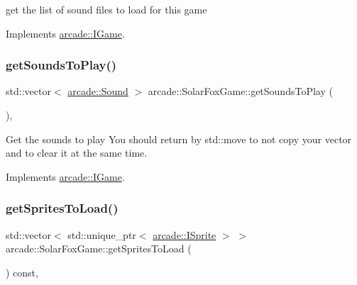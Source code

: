 get the list of sound files to load for this game 



Implements \hyperlink{classarcade_1_1_i_game_a0b66cd9ef3b5cd0dff95debb7e4f594e}{arcade\+::\+I\+Game}.

\mbox{\label{classarcade_1_1_solar_fox_game_a96f41df94a733d0c06f8a7d48e620d58}} 
\subsubsection{\texorpdfstring{get\+Sounds\+To\+Play()}{getSoundsToPlay()}}
{\footnotesize\ttfamily std\+::vector$<$ \hyperlink{structarcade_1_1_sound}{arcade\+::\+Sound} $>$ arcade\+::\+Solar\+Fox\+Game\+::get\+Sounds\+To\+Play (\begin{DoxyParamCaption}{ }\end{DoxyParamCaption})\hspace{0.3cm}{\ttfamily [override]}, {\ttfamily [virtual]}}



Get the sounds to play You should return by std\+::move to not copy your vector and to clear it at the same time. 



Implements \hyperlink{classarcade_1_1_i_game_a88b3c7efb13780cdbbdf5b879a18ed4d}{arcade\+::\+I\+Game}.

\mbox{\label{classarcade_1_1_solar_fox_game_afa9d714001212c869f616bd265dd9371}} 
\subsubsection{\texorpdfstring{get\+Sprites\+To\+Load()}{getSpritesToLoad()}}
{\footnotesize\ttfamily std\+::vector$<$ std\+::unique\+\_\+ptr$<$ \hyperlink{classarcade_1_1_i_sprite}{arcade\+::\+I\+Sprite} $>$ $>$ arcade\+::\+Solar\+Fox\+Game\+::get\+Sprites\+To\+Load (\begin{DoxyParamCaption}{ }\end{DoxyParamCaption}) const\hspace{0.3cm}{\ttfamily [override]}, {\ttfamily [virtual]}}



